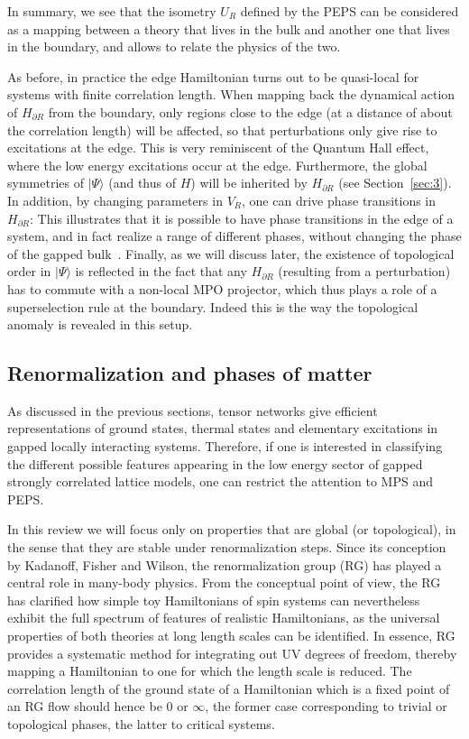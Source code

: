 \documentclass[rmp,aps,reprint,superscriptaddress,nobalancelastpage]{revtex4-1}
\newcommand{\ket}[1]{\vert#1\rangle}
\begin{document}
In summary, we see that the isometry $U_R$ defined by the PEPS can be considered as a mapping between a theory that lives in the bulk and another one that lives in the boundary, and allows to relate the physics of the two.

As before, in practice the edge Hamiltonian turns out to be quasi-local for systems with finite correlation length. When mapping back the dynamical action of $H_{\partial R}$ from the boundary, only regions close to the edge (at a distance of about the correlation length) will be affected, so that perturbations only give rise to excitations at the edge. This is very reminiscent of the Quantum Hall effect, where the low energy excitations occur at the edge. Furthermore, the global symmetries of $\ket\Psi$ (and thus of $H$) will be inherited by $H_{\partial R}$ (see Section~\ref{sec:3}). In addition, by changing parameters in $V_R$, one can drive phase transitions in $H_{\partial R}$: This illustrates that it is possible to have phase transitions in the edge of a system, and in fact realize a range of different phases, without changing the phase of the gapped bulk~\cite{yang:peps-edgetheories}. Finally, as we will discuss later, the existence of topological order in $\ket\Psi$ is reflected in the fact that any $H_{\partial R}$ (resulting from a perturbation) has to commute with a non-local MPO projector,  which thus plays a role of a superselection rule at the boundary. Indeed this is the way the topological anomaly is revealed in this setup.


\subsection{Renormalization and phases of matter  \label{renorm_secII}}

As discussed in the previous sections, tensor networks give efficient representations of ground states, thermal states and elementary excitations in gapped locally interacting systems. Therefore, if one is interested in classifying the different possible features appearing in the low energy sector of gapped strongly correlated lattice models, one can restrict the attention to MPS and PEPS.

In this review we will focus only on properties that are global (or topological), in the sense that they are stable under renormalization steps.  Since its conception by Kadanoff, Fisher and Wilson, the renormalization group (RG) has played a central role in many-body physics. From the conceptual point of view, the RG has clarified how simple toy Hamiltonians of spin systems can nevertheless exhibit the full spectrum of features of realistic Hamiltonians, as the universal properties of both theories at long length scales can be identified. In essence, RG provides a systematic method for integrating out UV degrees of freedom, thereby mapping a Hamiltonian to one for which the length scale is reduced. The correlation length of the ground state of a Hamiltonian which is a fixed point of an RG flow should hence be $0$ or $\infty$, the former case corresponding to trivial or topological phases, the latter to critical systems.
\end{document}
